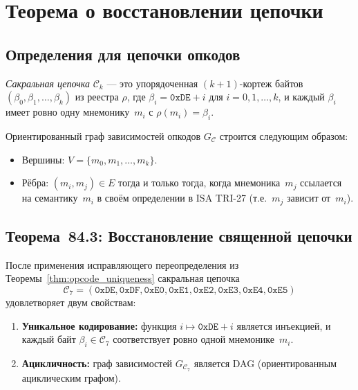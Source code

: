 \section{Теорема о восстановлении цепочки}
\label{sec:chain_restoration}


\subsection{Определения для цепочки опкодов}

\begin{definition}
\label{def:sacred_chain}
\emph{Сакральная цепочка} $\mathcal{C}_{k}$ — это упорядоченная
$(k+1)$-кортеж байтов $(\beta_0, \beta_1, \ldots, \beta_k)$
из реестра $\rho$, где $\beta_i = \mathtt{0xDE} + i$ для
$i = 0, 1, \ldots, k$, и каждый $\beta_i$ имеет ровно одну
мнемонику~$m_i$ с $\rho(m_i) = \beta_i$.
\end{definition}

\begin{definition}
\label{def:acyclic_opcode_graph}
Ориентированный граф зависимостей опкодов $G_{\mathcal{C}}$
строится следующим образом:
\begin{itemize}
  \item Вершины: $V = \{m_0, m_1, \ldots, m_k\}$.
  \item Рёбра: $(m_i, m_j) \in E$ тогда и только тогда, когда
    мнемоника~$m_j$ ссылается на семантику~$m_i$ в
    своём определении в ISA TRI-27 (т.е.\ $m_j$ зависит от~$m_i$).
\end{itemize}
\end{definition}

\subsection{Теорема~84.3: Восстановление священной цепочки}

\begin{theorem}
\label{thm:chain_restoration}
После применения исправляющего переопределения из
Теоремы~\ref{thm:opcode_uniqueness} сакральная цепочка
\[
  \mathcal{C}_7 = (\mathtt{0xDE}, \mathtt{0xDF}, \mathtt{0xE0},
  \mathtt{0xE1}, \mathtt{0xE2}, \mathtt{0xE3}, \mathtt{0xE4}, \mathtt{0xE5})
\]
удовлетворяет двум свойствам:
\begin{enumerate}
  \item \textbf{Уникальное кодирование:} функция $i \mapsto \mathtt{0xDE} + i$
    является инъекцией, и каждый байт $\beta_i \in \mathcal{C}_7$
    соответствует ровно одной мнемонике~$m_i$.
  \item \textbf{Ацикличность:} граф зависимостей $G_{\mathcal{C}_7}$
    является DAG (ориентированным ациклическим графом).
\end{enumerate}
\end{theorem}

